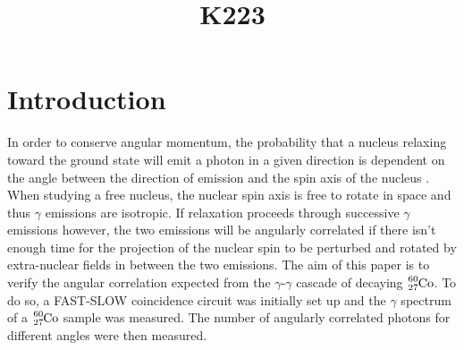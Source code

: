 \documentclass[twocolumn]{article}
\title{K223}
\begin{document}
\maketitle
\newpage
\section{Introduction}
In order to conserve angular momentum, the probability that a nucleus relaxing toward the ground state will emit a photon in a given direction is dependent on the angle between the direction of emission and the spin axis of the nucleus \cite{sieg}. When studying a free nucleus, the nuclear spin axis is free to rotate in space and thus $\gamma$ emissions are isotropic. If relaxation proceeds through successive $\gamma$ emissions however, the two emissions will be angularly correlated if there isn't enough time for the projection of the nuclear spin to be perturbed and rotated by extra-nuclear fields in between the two emissions. The aim of this paper is to verify the angular correlation expected from the $\gamma$-$\gamma$ cascade of decaying $\ce{_27^{60}Co}$. To do so, a FAST-SLOW coincidence circuit was initially set up and the $\gamma$ spectrum of a $\ce{_27^{60}Co}$ sample was measured. The number of angularly correlated photons for different angles were then measured.\cite{cfd}
\end{document}
